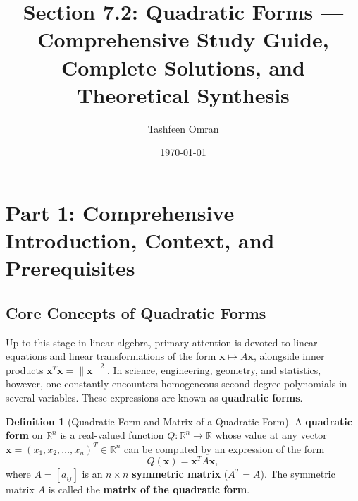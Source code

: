 \documentclass[11pt, letterpaper]{article}
\title{Section 7.2: Quadratic Forms --- Comprehensive Study Guide, Complete Solutions, and Theoretical Synthesis}
\author{Tashfeen Omran}
\date{\today}
\theoremstyle{definition}
\newtheorem{definition}{Definition}[section]
\theoremstyle{remark}
\newcommand{\R}{\mathbb{R}}
\begin{document}
\maketitle
\tableofcontents
\newpage

\section{Part 1: Comprehensive Introduction, Context, and Prerequisites}

\subsection{Core Concepts of Quadratic Forms}

Up to this stage in linear algebra, primary attention is devoted to linear equations and linear transformations of the form $\mathbf{x} \mapsto A\mathbf{x}$, alongside inner products $\mathbf{x}^T \mathbf{x} = \|\mathbf{x}\|^2$. In science, engineering, geometry, and statistics, however, one constantly encounters homogeneous second-degree polynomials in several variables. These expressions are known as \textbf{quadratic forms}.

\begin{definition}[Quadratic Form and Matrix of a Quadratic Form]
A \textbf{quadratic form} on $\R^n$ is a real-valued function $Q : \R^n \to \R$ whose value at any vector $\mathbf{x} = (x_1, x_2, \dots, x_n)^T \in \R^n$ can be computed by an expression of the form
\[
Q(\mathbf{x}) = \mathbf{x}^T A \mathbf{x},
\]
where $A = [a_{ij}]$ is an $n \times n$ \textbf{symmetric matrix} ($A^T = A$). The symmetric matrix $A$ is called the \textbf{matrix of the quadratic form}.
\end{definition}
\end{document}
